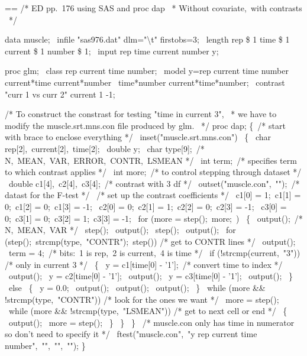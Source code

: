 \documentclass{book}
\makeatletter
\newenvironment{Texinfopreformatted}{%
  \par\GNUTobeylines\obeyspaces\frenchspacing\parskip=\z@\parindent=\z@}{}
{\catcode`\^^M=13 \gdef\GNUTobeylines{\catcode`\^^M=13 \def^^M{\null\par}}}
\newenvironment{Texinfoindented}{\begin{list}{}{}\item\relax}{\end{list}}
\renewcommand{\_}{\Texinfounderscore\discretionary{}{}{}}
\makeatother
\begin{document}
\begin{Texinfoindented}
\begin{Texinfopreformatted}%
\ttfamily 
/* ED pp.\ 176 using SAS and proc dap
\ * Without covariate,\ with contrasts
\ */

data muscle;
\ infile "sas976.dat" dlm="\textbackslash{}t" firstobs=3;
\ length rep \$ 1 time \$ 1 current \$ 1 number \$ 1;
\ input rep time current number y;

proc glm;
\ class rep current time number;
\ model y=rep current time number current*time current*number
\         time*number current*time*number;
\ contrast "curr 1 vs curr 2" current 1 -1;

/* To construct the constrast for testing "time in current 3",
\ * we have to modify the muscle.srt.mns.con file produced by glm.
\ */
proc dap;
\{\ /* start with brace to enclose everything */
\  inset("muscle.srt.mns.con")
\   \{
\     char rep[2],\ current[2],\ time[2];
\     double y;
\     char \_type\_[9];\ /* N,\ MEAN,\ VAR,\ ERROR,\ CONTR,\ LSMEAN */
\     int \_term\_;\ /* specifies term to which contrast applies */
\     int more;\ /* to control stepping through dataset */
\     double c1[4],\ c2[4],\ c3[4];\ /* contrast with 3 df */
\     outset("muscle.con",\ "");\ /* datast for the F-test */
\     /* set up the contrast coefficients */
\     c1[0] = 1;\ c1[1] = 0;\ c1[2] = 0;\ c1[3] = -1;
\     c2[0] = 0;\ c2[1] = 1;\ c2[2] = 0;\ c2[3] = -1;
\     c3[0] = 0;\ c3[1] = 0;\ c3[2] = 1;\ c3[3] = -1;
\     for (more = step();\ more;\ )
\      \{
\        output();\ /* N,\ MEAN,\ VAR */
\        step();
\        output();
\        step();
\        output();
\        for (step();\ strcmp(\_type\_,\ "CONTR");\ step()) /* get to CONTR lines */
\          output();
\        \_term\_ = 4;\ /* bits:\ 1 is rep,\ 2 is current,\ 4 is time */
\        if (!strcmp(current,\ "3")) /* only in current 3 */
\         \{
\           y = c1[time[0] - '1'];\ /* convert time to index */
\           output();
\           y = c2[time[0] - '1'];
\           output();
\           y = c3[time[0] - '1'];
\           output();
\         \}
\        else
\         \{
\           y = 0.0;
\           output();
\           output();
\           output();
\         \}
\        while (more \&\& !strcmp(\_type\_,\ "CONTR")) /* look for the ones we want */
\           more = step();
\        while (more \&\& !strcmp(\_type\_,\ "LSMEAN")) /* get to next cell or end */
\         \{
\           output();
\           more = step();
\         \}
\      \}
\   \}
\  /* muscle.con only has time in numerator so don't need to specify it */
\  ftest("muscle.con",\ "y rep current time number",\ "",\ "",\ "");
\}

\end{Texinfopreformatted}
\end{Texinfoindented}
\end{document}
